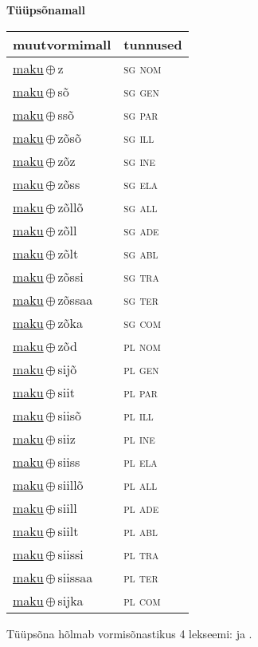 

\vspace{3.5em}
\noindent \begin{minipage}{\textwidth}
\noindent \textbf{Tüüpsõnamall \,}\\

\begin{sideways}
\begin{tabular}{l l}
muutvormimall & tunnused \\
\hline
\underline{maku}\,$\oplus$\,z & \textsc{ sg nom } \\
\underline{maku}\,$\oplus$\,sõ & \textsc{ sg gen } \\
\underline{maku}\,$\oplus$\,ssõ & \textsc{ sg par } \\
\underline{maku}\,$\oplus$\,zõsõ & \textsc{ sg ill } \\
\underline{maku}\,$\oplus$\,zõz & \textsc{ sg ine } \\
\underline{maku}\,$\oplus$\,zõss & \textsc{ sg ela } \\
\underline{maku}\,$\oplus$\,zõllõ & \textsc{ sg all } \\
\underline{maku}\,$\oplus$\,zõll & \textsc{ sg ade } \\
\underline{maku}\,$\oplus$\,zõlt & \textsc{ sg abl } \\
\underline{maku}\,$\oplus$\,zõssi & \textsc{ sg tra } \\
\underline{maku}\,$\oplus$\,zõssaa & \textsc{ sg ter } \\
\underline{maku}\,$\oplus$\,zõka & \textsc{ sg com } \\
\underline{maku}\,$\oplus$\,zõd & \textsc{ pl nom } \\
\underline{maku}\,$\oplus$\,sijõ & \textsc{ pl gen } \\
\underline{maku}\,$\oplus$\,siit & \textsc{ pl par } \\
\underline{maku}\,$\oplus$\,siisõ & \textsc{ pl ill } \\
\underline{maku}\,$\oplus$\,siiz & \textsc{ pl ine } \\
\underline{maku}\,$\oplus$\,siiss & \textsc{ pl ela } \\
\underline{maku}\,$\oplus$\,siillõ & \textsc{ pl all } \\
\underline{maku}\,$\oplus$\,siill & \textsc{ pl ade } \\
\underline{maku}\,$\oplus$\,siilt & \textsc{ pl abl } \\
\underline{maku}\,$\oplus$\,siissi & \textsc{ pl tra } \\
\underline{maku}\,$\oplus$\,siissaa & \textsc{ pl ter } \\
\underline{maku}\,$\oplus$\,sijka & \textsc{ pl com } \\
\end{tabular}
\end{sideways}
\label{tab:tüüpsõnamall-makuz}

\end{minipage}

 
\vspace{1em}
\noindent Tüüpsõna hõlmab vormisõnastikus 4 lekseemi:  ja .

